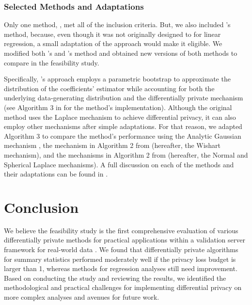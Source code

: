 \subsubsection{Selected Methods and Adaptations}\label{subsubsec:reg_meth}
Only one method, \citet{ferrando2020general}, met all of the inclusion criteria. But, we also included \citet{brawner2018bootstrap}'s method, because, even though it was not originally designed to for linear regression, a small adaptation of the approach would make it eligible. We modified both \citet{ferrando2020general}'s and \citet{brawner2018bootstrap}'s method and obtained new versions of both methods to compare in the feasibility study. 

Specifically, \citet{ferrando2020general}'s approach employs a parametric bootstrap to approximate the distribution of the coefficients' estimator while accounting for both the underlying data-generating distribution and the differentially private mechanism (see Algorithm 3 in \citet{ferrando2020general} for the method's implementation). Although the original method uses the Laplace mechanism to achieve differential privacy, it can also employ other mechanisms after simple adaptations. For that reason, we adapted Algorithm 3 to compare the method's performance using the Analytic Gaussian mechanism \citet{balle2018improving}, the mechanism in Algorithm 2 from \citet{sheffet2019old} (hereafter, the Wishart mechanism), and the mechanisms in Algorithm 2 from \citet{wang2019differentially} (hereafter, the Normal and Spherical Laplace mechanisms). A full discussion on each of the methods and their adaptations can be found in \citet{barrientos2021}.


\section{Conclusion}\label{sec:conclusion}
We believe the feasibility study is the first comprehensive evaluation of various differentially private methods for practical applications within a validation server framework for real-world data \citep{barrientos2021}. We found that differentially private algorithms for summary statistics performed moderately well if the privacy loss budget is larger than 1, whereas methods for regression analyses still need improvement. Based on conducting the study and reviewing the results, we identified the methodological and practical challenges for implementing differential privacy on more complex analyses and avenues for future work.

